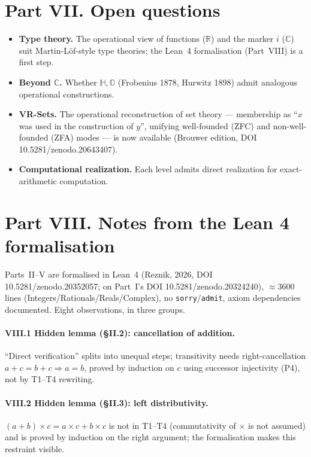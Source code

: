 \documentclass[11pt]{article}
\theoremstyle{definition}
\newcommand{\R}{\mathbb{R}}
\newcommand{\C}{\mathbb{C}}
\begin{document}
\section*{Part VII. Open questions}
\begin{itemize}
\item[(1)] \textbf{Type theory.} The operational view of functions ($\R$) and the marker $i$ ($\C$)
suit Martin-L\"of-style type theories; the Lean~4 formalisation (Part~VIII) is a first step.
\item[(2)] \textbf{Beyond $\C$.} Whether $\mathbb{H},\mathbb{O}$ (Frobenius 1878, Hurwitz 1898)
admit analogous operational constructions.
\item[(3)] \textbf{VR-Sets.} The operational reconstruction of set theory --- membership as ``$x$ was
used in the construction of $y$'', unifying well-founded (ZFC) and non-well-founded (ZFA) modes ---
is now available (Brouwer edition, DOI 10.5281/zenodo.20643407).
\item[(4)] \textbf{Computational realization.} Each level admits direct realization for exact-arithmetic
computation.
\end{itemize}

\section*{Part VIII. Notes from the Lean 4 formalisation}

Parts~II--V are formalised in Lean~4 (Reznik, 2026, DOI 10.5281/zenodo.20352057; on Part~I's
DOI 10.5281/zenodo.20324240), $\approx 3600$ lines (Integers/Rationals/Reals/Complex), no
\texttt{sorry}/\texttt{admit}, axiom dependencies documented. Eight observations, in three groups.

\paragraph{VIII.1 Hidden lemma (\S II.2): cancellation of addition.} ``Direct verification'' splits into
unequal steps; transitivity needs right-cancellation $a+c=b+c\Rightarrow a=b$, proved by induction
on $c$ using successor injectivity (P4), not by T1--T4 rewriting.

\paragraph{VIII.2 Hidden lemma (\S II.3): left distributivity.} $(a+b)\times c=a\times c+b\times c$ is
not in T1--T4 (commutativity of $\times$ is not assumed) and is proved by induction on the right
argument; the formalisation makes this restraint visible.
\end{document}
